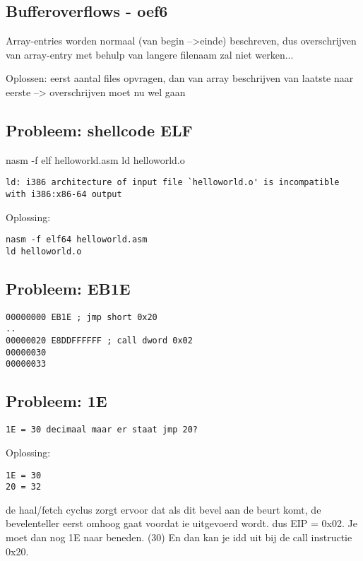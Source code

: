 \subsection{Bufferoverflows - oef6}
Array-entries worden normaal (van begin --\textgreater einde) beschreven, dus overschrijven van array-entry met behulp van langere filenaam zal niet werken...

Oplossen: eerst aantal files opvragen, dan van array beschrijven van laatste naar eerste --> overschrijven moet nu wel gaan

\subsection{Probleem: shellcode ELF}

nasm -f elf helloworld.asm ld helloworld.o
\begin{lstlisting}
ld: i386 architecture of input file `helloworld.o' is incompatible with i386:x86-64 output
\end{lstlisting}

Oplossing:
\begin{lstlisting}
nasm -f elf64 helloworld.asm
ld helloworld.o
\end{lstlisting}
    

\subsection{Probleem: EB1E}
\begin{lstlisting}
00000000 EB1E ; jmp short 0x20
..
00000020 E8DDFFFFFF ; call dword 0x02
00000030
00000033
\end{lstlisting}
    

\subsection{Probleem: 1E}
\begin{lstlisting}
1E = 30 decimaal maar er staat jmp 20?
\end{lstlisting}
    
Oplossing:
\begin{lstlisting}
1E = 30
20 = 32
\end{lstlisting}
de haal/fetch cyclus zorgt ervoor dat als dit bevel aan de beurt komt, de bevelenteller eerst omhoog gaat voordat ie uitgevoerd wordt. dus EIP = 0x02. Je moet dan nog 1E naar beneden. (30) En dan kan je idd uit bij de call instructie 0x20.